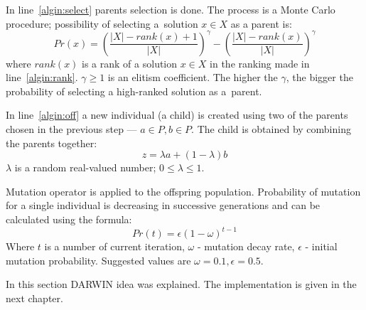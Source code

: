 In line~\ref{algin:select} parents selection is done. The process is a Monte
Carlo procedure; possibility of selecting a~solution $x \in X$ as a parent
is:\\
$$Pr(x) = \left( \frac{|X|-\textit{rank}(x) + 1}{|X|} \right)^\gamma - \left(
\frac{|X|-\textit{rank}(x)}{|X|} \right)^\gamma$$ where $\textit{rank}(x)$ is
a rank of a solution $x \in X$ in the ranking made in
line~\ref{algin:rank}. $\gamma \geq 1$ is an elitism coefficient. The higher
the $\gamma$, the bigger the probability of selecting a high-ranked solution
as a~parent.

In line~\ref{algin:off} a new individual (a child) is created using two of the
parents chosen in the previous step --- $a \in P, b \in P$. The child is
obtained by combining the parents together: $$z = \lambda a + (1 - \lambda)
b$$ $\lambda$ is a random real-valued number; $0 \leq \lambda \leq 1$.


Mutation operator is applied to the offspring population. Probability of
mutation for a single individual is decreasing in successive generations and
can be calculated using the formula: $$Pr(t) = \epsilon (1 - \omega)^{t-1}$$
Where $t$ is a number of current iteration, $\omega$ - mutation decay rate,
$\epsilon$ - initial mutation probability. Suggested values are
$\omega = 0.1, \epsilon = 0.5$.

In this section DARWIN idea was explained. The implementation is given in the
next chapter.
